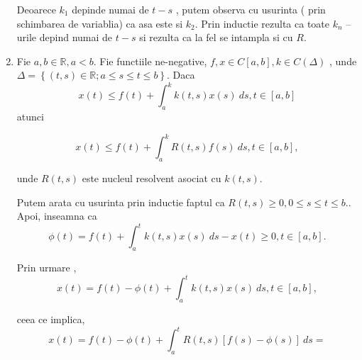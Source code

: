 \documentclass[a4paper,12pt,oneside]{report}
\begin{document}
\begin{enumerate}
		      	Deoarece \(k_{1}\) depinde numai de \(t-s\) , putem observa cu usurinta ( prin schimbarea de variablia) ca asa este si \(k_{2}\). Prin inductie rezulta ca toate \(k_{n}\) – urile depind numai de \(t-s\)  si rezulta ca la fel se intampla si cu \(R\). 
		      			      			      			      			      	
		      	\item Fie \(a,b \in \mathbb{R}, a< b\). Fie functiile ne-negative, \(f,x \in C\left [ a,b \right ], k\in C\left ( \Delta  \right )\) , unde \(\Delta  = \left \{ \left ( t,s \right ) \in \mathbb{R}; a\leq s\leq t\leq b\right \}\). Daca 
		      	\begin{displaymath}
		      		x\left ( t \right ) \leq f\left ( t \right ) + \int_{a}^{k}k\left ( t,s \right )x\left ( s \right )\ ds , t\in \left [ a,b \right ]
		      	\end{displaymath}
		      	atunci 
		      			      			      			      			      	
		      	\begin{displaymath}
		      		x\left ( t \right ) \leq f\left ( t \right ) + \int_{a}^{k}R\left ( t,s \right )f\left ( s \right )\ ds , t\in \left [ a,b \right ],
		      	\end{displaymath}
		      			      			      			      			      	
		      	unde \(R\left ( t,s \right )\) este nucleul resolvent asociat cu \(k\left ( t,s \right )\).
		      			      			      			      			      	
		      			      			      			      			      	
		      	Putem arata cu usurinta prin inductie faptul ca \(R\left ( t,s \right ) \geq 0, 0\leq s\leq t\leq b..\) 
		      	Apoi, inseamna ca 
		      	\begin{displaymath}
		      		\phi \left ( t \right ) = f\left ( t \right ) + \int_{a}^{t} k\left ( t,s \right ) x\left ( s \right ) \ ds - x\left ( t \right ) \geq 0, t \in \left [ a,b \right ].
		      	\end{displaymath}
		      			      			      			      			      	
		      	Prin urmare ,
		      	\begin{displaymath}
		      		x\left ( t \right ) = f\left ( t \right ) - \phi \left ( t \right ) + \int_{a}^{t} k\left ( t,s \right )x\left ( s \right ) \ ds , t \in \left [ a,b \right ], 
		      	\end{displaymath}
		      			      			      			      			      	
		      	ceea ce implica, 
		      	\begin{displaymath}
		      		x\left ( t \right ) = f\left ( t \right ) - \phi \left ( t \right ) + \int_{a}^{t} R\left ( t,s \right ) \left [ f\left ( s \right ) - \phi \left ( s \right ) \right ]\ ds = 
		      	\end{displaymath}
		      			      			      			      			      	

\end{enumerate}
\end{document}
